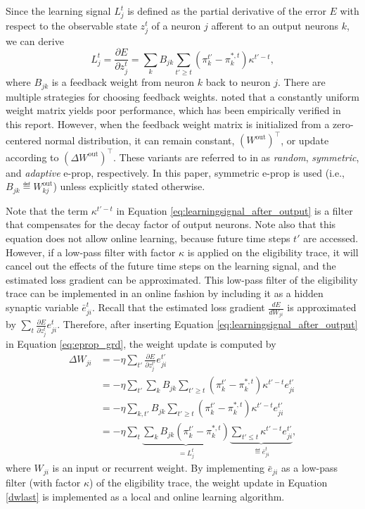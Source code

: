         Since the learning signal $L^t_j$ is defined as the partial derivative of the error $E$ with respect to the observable state $z_j^t$ of a neuron $j$ afferent to an output neurons $k$, we can derive
        \begin{equation}\label{eq:learningsignal_after_output}
        L^t_j = \frac{\partial E}{\partial z^t_j} = \sum_kB_{jk}\sum_{t'\geq t}\left(\pi^{t'}_k - \pi^{*,t}_k\right)\kappa^{t'-t},
        \end{equation}
        where $B_{jk}$ is a feedback weight from neuron $k$ back to neuron $j$.
        There are multiple strategies for choosing feedback weights.
        \citet{bellec2020solution} noted that a constantly uniform weight matrix yields poor performance, which has been empirically verified in this report.
        However, when the feedback weight matrix is initialized from a zero-centered normal distribution, it can remain constant, $(W^\text{out})^\top$, or update according to $(\Delta W^\text{out})^\top$.
        These variants are referred to in \citet{bellec2020solution} as \emph{random}, \emph{symmetric}, and \emph{adaptive} e-prop, respectively.
        In this paper, symmetric e-prop is used (i.e., $B_{jk} \eqdef W^\text{out}_{kj}$) unless explicitly stated otherwise.

        Note that the term $\kappa^{t'-t}$ in Equation \ref{eq:learningsignal_after_output} is a filter that compensates for the decay factor of output neurons.
        Note also that this equation does not allow online learning, because future time steps $t'$ are accessed.
        However, if a low-pass filter with factor $\kappa$ is applied on the eligibility trace, it will cancel out the effects of the future time steps on the learning signal, and the estimated loss gradient can be approximated.
        This low-pass filter of the eligibility trace can be implemented in an online fashion by including it as a hidden synaptic variable $\bar{e}^t_{ji}$.
        Recall that the estimated loss gradient $\frac{dE}{dW_{ji}}$ is approximated by $\sum_t \frac{\partial E}{\partial z^t_j}e^t_{ji}$.
        Therefore, after inserting Equation \ref{eq:learningsignal_after_output} in Equation \ref{eq:eprop_grd}, the weight update is computed by
        \begin{align}
        \Delta W_{ji} &= -\eta\sum_{t'}\frac{\partial E}{\partial z^{t'}_j}e^{t'}_{ji}\\
        &= -\eta\sum_{t'}\sum_kB_{jk}\sum_{t'\geq t}\left(\pi^{t'}_k - \pi^{*,t}_k\right)\kappa^{t'-t}e^{t'}_{ji}\\
        &= -\eta\sum_{k, t'}B_{jk}\sum_{t'\geq t}\left(\pi^{t'}_k - \pi^{*,t}_k\right)\kappa^{t'-t}e^{t'}_{ji}\\
        &= -\eta\sum_t\underbrace{\sum_kB_{jk}\left(\pi^{t'}_k - \pi^{*,t}_k\right)}_{=L^t_j}\underbrace{\sum_{t'\leq t}\kappa^{t'-t}e^{t'}_{ji}}_{\eqdef \bar{e}^t_{ji}}\label{dwlast},
        \end{align}
        where $W_{ji}$ is an input or recurrent weight.
        By implementing $\bar{e}_{ji}$ as a low-pass filter (with factor $\kappa$) of the eligibility trace, the weight update in Equation \ref{dwlast} is implemented as a local and online learning algorithm.

